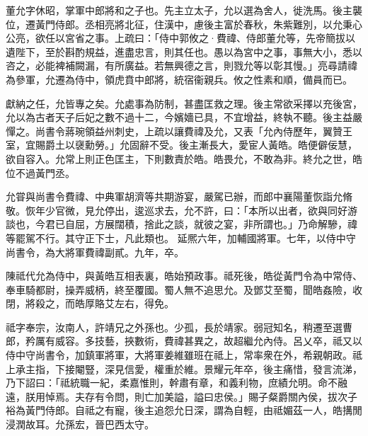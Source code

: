 \begin{pinyinscope}
 
 
 董允字休昭，掌軍中郎將和之子也。先主立太子，允以選為舍人，徙洗馬。後主襲位，遷黃門侍郎。丞相亮將北征，住漢中，慮後主富於春秋，朱紫難別，以允秉心公亮，欲任以宮省之事。上疏曰：「侍中郭攸之·費禕、侍郎董允等，先帝簡拔以遺陛下，至於斟酌規益，進盡忠言，則其任也。愚以為宮中之事，事無大小，悉以咨之，必能裨補闕漏，有所廣益。若無興德之言，則戮允等以彰其慢。」亮尋請禕為參軍，允遷為侍中，領虎賁中郎將，統宿衞親兵。攸之性素和順，備員而已。
 
 
 獻納之任，允皆專之矣。允處事為防制，甚盡匡救之理。後主常欲采擇以充後宮，允以為古者天子后妃之數不過十二，今嬪嬙已具，不宜增益，終執不聽。後主益嚴憚之。尚書令蔣琬領益州刺史，上疏以讓費禕及允，又表「允內侍歷年，翼贊王室，宜賜爵土以襃勳勞。」允固辭不受。後主漸長大，愛宦人黃皓。皓便僻佞慧，欲自容入。允常上則正色匡主，下則數責於皓。皓畏允，不敢為非。終允之世，皓位不過黃門丞。
 
 
允甞與尚書令費禕、中典軍胡濟等共期游宴，嚴駕已辦，而郎中襄陽董恢詣允脩敬。恢年少官微，見允停出，逡巡求去，允不許，曰：「本所以出者，欲與同好游談也，今君已自屈，方展闊積，捨此之談，就彼之宴，非所謂也。」乃命解驂，禕等罷駕不行。其守正下士，凡此類也。
 延熈六年，加輔國將軍。七年，以侍中守尚書令，為大將軍費禕副貳。九年，卒。
 
 
 
 
 陳祗代允為侍中，與黃皓互相表裏，皓始預政事。祗死後，皓從黃門令為中常侍、奉車騎都尉，操弄威柄，終至覆國。蜀人無不追思允。及鄧艾至蜀，聞皓姦險，收閉，將殺之，而皓厚賂艾左右，得免。
 
 
祗字奉宗，汝南人，許靖兄之外孫也。少孤，長於靖家。弱冠知名，稍遷至選曹郎，矜厲有威容。多技藝，挾數術，費禕甚異之，故超繼允內侍。呂乂卒，祗又以侍中守尚書令，加鎮軍將軍，大將軍姜維雖班在祗上，常率衆在外，希親朝政。祗上承主指，下接閹豎，深見信愛，權重於維。景耀元年卒，後主痛惜，發言流涕，乃下詔曰：「祗統職一紀，柔嘉惟則，幹肅有章，和義利物，庶績允明。命不融遠，朕用悼焉。夫存有令問，則亡加美謚，謚曰忠侯。」賜子粲爵關內侯，拔次子裕為黃門侍郎。自祗之有寵，後主追怨允日深，謂為自輕，由祗媚茲一人，皓搆閒浸潤故耳。允孫宏，晉巴西太守。
 
 
\end{pinyinscope}